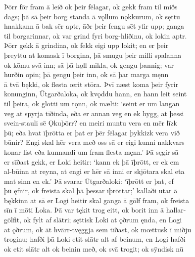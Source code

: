 \documentclass[12pt,letterpaper]{book}
\begin{document}
\begin{linenumbers}
Þōrr fōr fram ā leið ok þeir fēlagar, ok gekk fram til miðs\\
dags; þā sā þeir borg standa ā vǫllum nǫkkurum, ok sęttu\\
hnakkann ā bak sēr aptr, āðr þeir fengu sēt yfir upp; ganga\\
til borgarinnar, ok var grind fyri borg-hliðinu, ok lokin aptr.\\
Þōrr gekk ā grindina, ok fekk eigi upp lokit; en er þeir\\
þreyttu at komask ī borgina, þā smugu þeir milli spalanna\\
ok kōmu svā inn; sā þā hǫll mikla, ok gengu þannig; var\\
hurðin opin; þā gengu þeir inn, ok sā þar marga męnn\\
ā tvā bękki, ok flesta œrit stōra.  Þvī næst koma þeir fyrir\\
konunginn, Ūtgarðaloka, ok kvǫddu hann, en hann leit seint\\
til þeira, ok glotti um tǫnn, ok mælti: `seint er um langan\\
veg at spyrja tīðinda, eða er annan veg en ek hygg, at þessi\\
svein-stauli sē Ǫkuþōrr? en meiri muntu vera en mēr līzk\\
þū; eða hvat īþrōtta er þat er þēr fēlagar þykkizk vera við\\
būnir?  Engi skal hēr vera með oss sā er eigi kunni nakkvars\\
konar list eða kunnandi um fram flesta męnn.'  Þā sęgir sā\\
er sīðast gekk, er Loki heitir: `kann ek þā īþrōtt, er ek em\\
al-būinn at reyna, at engi er hēr sā inni er skjōtara skal eta\\
mat sinn en ek.'  Þā svarar Ūtgarðaloki: `īþrōtt er þat, ef\\
þū ęfnir, ok freista skal þā þessar īþrōttar;' kallaði utar ā\\
bękkinn at sā er Logi heitir skal ganga ā gōlf fram, ok freista\\
sīn ī mōti Loka.  Þā var tękit trog eitt, ok borit inn ā hallar-\\
gōlfit, ok fylt af slātri; sęttisk Loki at ǫðrum ęnda, en Logi\\
at ǫðrum, ok āt hvārr-tvęggja sem tīðast, ok mœttusk ī miðju\\
troginu; hafði þā Loki etit slātr alt af beinum, en Logi hafði\\
ok etit slātr alt ok beinin með, ok svā trogit; ok sȳndisk nū\\

\end{linenumbers}
\end{document}
